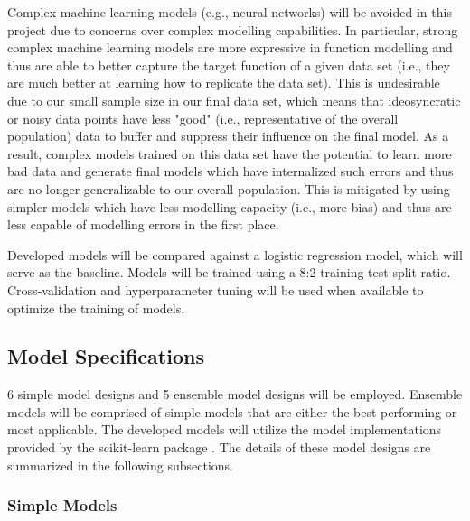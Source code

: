 \documentclass[10pt,sigconf,letterpaper,nonacm]{acmart}
\begin{document}
Complex machine learning models (e.g., neural networks) will be avoided in this project due to concerns over complex modelling capabilities.
In particular, strong complex machine learning models are more expressive in function modelling and thus are able to better capture the target function of a given data set (i.e., they are much better at learning how to replicate the data set).
This is undesirable due to our small sample size in our final data set, which means that ideosyncratic or noisy data points have less "good" (i.e., representative of the overall population) data to buffer and suppress their influence on the final model.
As a result, complex models trained on this data set have the potential to learn more bad data and generate final models which have internalized such errors and thus are no longer generalizable to our overall population.
This is mitigated by using simpler models which have less modelling capacity (i.e., more bias) and thus are less capable of modelling errors in the first place.

Developed models will be compared against a logistic regression model, which will serve as the baseline.
Models will be trained using a 8:2 training-test split ratio.
Cross-validation and hyperparameter tuning will be used when available to optimize the training of models.

\subsection{Model Specifications}

6 simple model designs and 5 ensemble model designs will be employed.
Ensemble models will be comprised of simple models that are either the best performing or most applicable.
The developed models will utilize the model implementations provided by the scikit-learn package \cite{scikit-learn}.
The details of these model designs \cite{sklearn_api, scikit_ref} are summarized in the following subsections.

\subsubsection{Simple Models}
\end{document}
